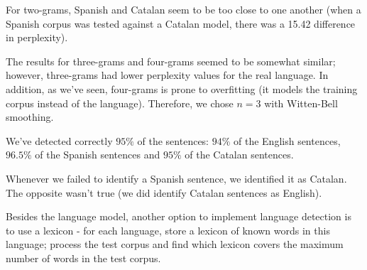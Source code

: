 \documentclass[paper=a4, fontsize=11pt]{scrartcl} %
\numberwithin{equation}{section} %
\numberwithin{figure}{section} %
\numberwithin{table}{section} %
\begin{document}
For two-grams, Spanish and Catalan seem to be too close to one another (when a Spanish corpus was tested against a Catalan model,
there was a 15.42 difference in perplexity).

The results for three-grams and four-grams seemed to be somewhat similar; however, three-grams had lower perplexity values for the real
language. In addition, as we've seen, four-grams is prone to overfitting (it models the training corpus instead of the language). Therefore,
we chose $n=3$ with Witten-Bell smoothing.

We've detected correctly $95\%$ of the sentences: $94\%$ of the English sentences, $96.5\%$ of the Spanish sentences and $95\%$ of the Catalan sentences.

Whenever we failed to identify a Spanish sentence, we identified it as Catalan. The opposite wasn't true (we did identify Catalan sentences as English).

Besides the language model, another option to implement language detection is to use a lexicon - for each language, store a lexicon
of known words in this language; process the test corpus and find which lexicon covers the maximum number of words in the test corpus.
\end{document}

